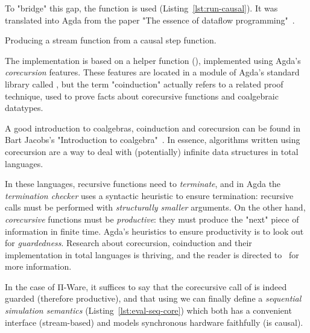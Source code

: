             To "bridge" this gap, the  function is used (Listing~\ref{lst:run-causal}).
            It was translated into Agda from the paper
            "The essence of dataflow programming"~\cite{essence-dataflow-programming}.

            \begin{listing}[h]
                \caption{Producing a stream function from a causal step function.\label{lst:run-causal}}
            \end{listing}

            The implementation is based on a helper function (),
            implemented using Agda's \emph{corecursion} features.
            These features are located in a module of Agda's standard library called ,
            but the term "coinduction" actually refers to a related proof technique,
            used to prove facts about corecursive functions and coalgebraic datatypes.

            A good introduction to coalgebras, coinduction and corecursion can be found in
            Bart Jacobs's "Introduction to coalgebra"~\cite{introduction-coalgebra-jacobs}.
            In essence, algorithms written using corecursion are a way to deal with (potentially) infinite
            data structures in total languages.

            In these languages, recursive functions need to \emph{terminate},
            and in Agda the \emph{termination checker} uses a syntactic heuristic to ensure termination:
            recursive calls must be performed with \emph{structurally smaller} arguments.
            On the other hand, \emph{corecursive} functions must be \emph{productive}:
            they must produce the "next" piece of information in finite time.
            Agda's heuristics to ensure productivity is to look out for \emph{guardedness}.
            Research about corecursion, coinduction and their implementation in total languages is thriving,
            and the reader is directed to~\cite{coinductive-inductive-termination} for more information.

            In the case of Π-Ware, it suffices to say that the corecursive call of 
            is indeed guarded (therefore productive), and that using  we can finally define
            a \emph{sequential simulation semantics} (Listing~\ref{lst:eval-seq-core}) which both
            has a convenient interface (stream-based) and models synchronous hardware faithfully (is causal).

